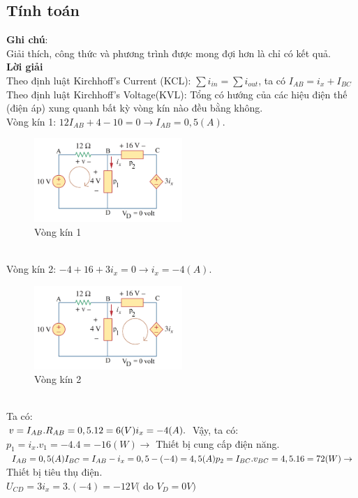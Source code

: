 \subsection{Tính toán}
\textbf{Ghi chú}:\\
Giải thích, công thức và phương trình được mong đợi hơn là chỉ có kết quả.\\
\textbf{Lời giải}\\
Theo định luật Kirchhoff's Current (KCL): \(\displaystyle \sum i_{in} = \sum i_{out} \), ta có \(I_{AB} = i_x + I_{BC}\)\\
Theo định luật Kirchhoff's Voltage(KVL): Tổng có hướng của các hiệu điện thế (điện áp) xung quanh bất kỳ vòng kín nào đều bằng không.\\
Vòng kín 1:
\(12I_{AB} + 4 - 10 = 0 \rightarrow I_{AB} = 0,5 (A).\)
\begin{figure}[!htbp]
    \centering
    \includegraphics[width=0.5\textwidth]{graphics/ex9/f2.png}
    \caption{Vòng kín 1}
    \end{figure}\\
Vòng kín 2: \(-4 + 16 + 3i_x = 0 \rightarrow i_x = -4 (A).\)
\begin{figure}[!htbp]
    \centering
    \includegraphics[width=0.5\textwidth]{graphics/ex9/f3.png}
    \caption{Vòng kín 2}
\end{figure}\\
Ta có:\\
\(
    v = I_{AB}.R_{AB} = 0,5.12 = 6 (V)\\
    i_x = -4 (A).\\
\)
Vậy, ta có:\\
\(
p_1 = i_x.v_1= -4.4 = -16 (W) \rightarrow \) Thiết bị cung cấp điện năng.\\
\(I_{AB} = 0,5 (A)\\
I_{BC} = I_{AB} - i_x = 0,5 - (-4) = 4,5 (A) \\
p_2 = I_{BC}.v_{BC} = 4,5.16 = 72 (W) \rightarrow\) Thiết bị tiêu thụ điện.\\
\(U_{CD} = 3i_x = 3.(-4) = -12 V (\) do \(V_D = 0 V)\)
